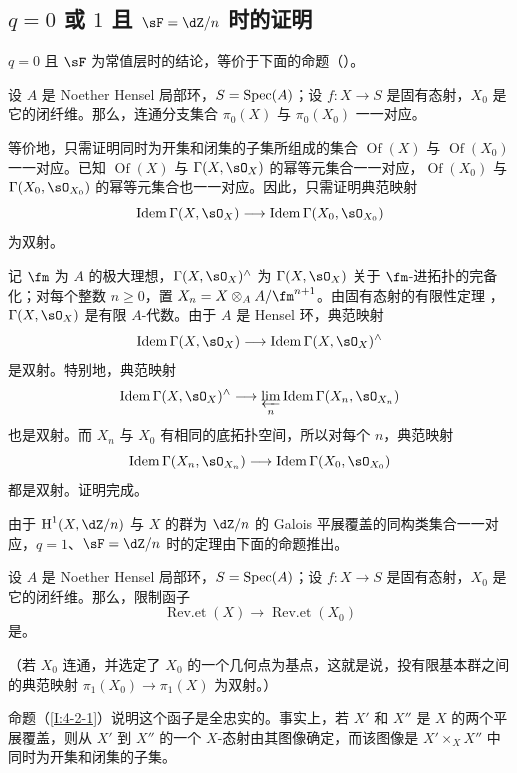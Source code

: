 \subsection{\texorpdfstring{$q=0$}{q=0} 或 \texorpdfstring{$1$}{1} 且 \texorpdfstring{$\sF=\dZ/n$}{F=Z/n} 时的证明}\label{I:4-2}
$q=0$ 且 $\sF$ 为常值层时的结论，等价于下面的命题（）。
\begin{proposition}\label{I:4-2-1}
设 $A$ 是 Noether Hensel 局部环，$S=\operatorname{Spec}(A)$；设 $f:X\to S$ 是固有态射，$X_0$ 是它的闭纤维。那么，连通分支集合 $\pi_0(X)$ 与 $\pi_0(X_0)$ 一一对应。
\end{proposition}
等价地，只需证明同时为开集和闭集的子集所组成的集合 $\operatorname{Of}(X)$ 与 $\operatorname{Of}(X_0)$ 一一对应。已知 $\operatorname{Of}(X)$ 与 $\Gamma(X,\sO_X)$ 的幂等元集合一一对应，$\operatorname{Of}(X_0)$ 与 $\Gamma(X_0,\sO_{X_0})$ 的幂等元集合也一一对应。因此，只需证明典范映射
\[
\operatorname{Idem}\Gamma(X,\sO_X)\longrightarrow\operatorname{Idem}\Gamma(X_0,\sO_{X_0})
\]
为双射。

记 $\fm$ 为 $A$ 的极大理想，$\Gamma(X,\sO_X)^\wedge$ 为 $\Gamma(X,\sO_X)$ 关于 $\fm$-进拓扑的完备化；对每个整数 $n\geqslant0$，置 $X_n=X\otimes_AA/\fm^{n+1}$。由固有态射的有限性定理 \cite[III.3.2]{ega}，$\Gamma(X,\sO_X)$ 是有限 $A$-代数。由于 $A$ 是 Hensel 环，典范映射
\[
\operatorname{Idem}\Gamma(X,\sO_X)\longrightarrow\operatorname{Idem}\Gamma(X,\sO_X)^\wedge
\]
是双射。特别地，典范映射
\[
\operatorname{Idem}\Gamma(X,\sO_X)^\wedge\longrightarrow\varprojlim_n\operatorname{Idem}\Gamma(X_n,\sO_{X_n})
\]
也是双射。而 $X_n$ 与 $X_0$ 有相同的底拓扑空间，所以对每个 $n$，典范映射
\[
\operatorname{Idem}\Gamma(X_n,\sO_{X_n})\longrightarrow\operatorname{Idem}\Gamma(X_0,\sO_{X_0})
\]
都是双射。证明完成。

由于 $\h^1(X,\dZ/n)$ 与 $X$ 的群为 $\dZ/n$ 的 Galois 平展覆盖的同构类集合一一对应，$q=1$、$\sF=\dZ/n$ 时的定理由下面的命题推出。
\begin{proposition}\label{I:4-2-2}
设 $A$ 是 Noether Hensel 局部环，$S=\operatorname{Spec}(A)$；设 $f:X\to S$ 是固有态射，$X_0$ 是它的闭纤维。那么，限制函子
\[
\operatorname{Rev.et}(X)\longrightarrow\operatorname{Rev.et}(X_0)
\]
是。
\end{proposition}
（若 $X_0$ 连通，并选定了 $X_0$ 的一个几何点为基点，这就是说，投有限基本群之间的典范映射 $\pi_1(X_0)\to\pi_1(X)$ 为双射。）

命题（\ref{I:4-2-1}）说明这个函子是全忠实的。事实上，若 $X'$ 和 $X''$ 是 $X$ 的两个平展覆盖，则从 $X'$ 到 $X''$ 的一个 $X$-态射由其图像确定，而该图像是 $X'\times_XX''$ 中同时为开集和闭集的子集。

